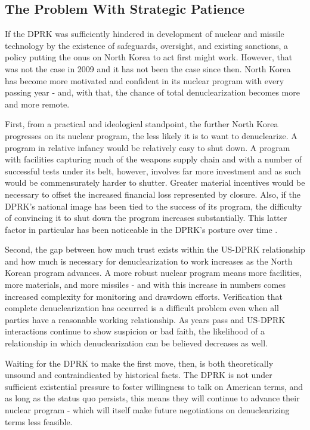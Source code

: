 \subsection{The Problem With Strategic Patience}

If the DPRK was sufficiently hindered in development of nuclear and missile technology by the existence of safeguards, oversight, and existing sanctions, a policy putting the onus on North Korea to act first might work. However, that was not the case in 2009 and it has not been the case since then. North Korea has become more motivated and confident in its nuclear program with every passing year - and, with that, the chance of total denuclearization becomes more and more remote.

First, from a practical and ideological standpoint, the further North Korea progresses on its nuclear program, the less likely it is to want to denuclearize. A program in relative infancy would be relatively easy to shut down. A program with facilities capturing much of the weapons supply chain and with a number of successful tests under its belt, however, involves far more investment and as such would be commensurately harder to shutter. Greater material incentives would be necessary to offset the increased financial loss represented by closure. Also, if the DPRK's national image has been tied to the success of its program, the difficulty of convincing it to shut down the program increases substantially. This latter factor in particular has been noticeable in the DPRK's posture over time \cite{rich14,hecker2}.

Second, the gap between how much trust exists within the US-DPRK relationship and how much is necessary for denuclearization to work increases as the North Korean program advances. A more robust nuclear program means more facilities, more materials, and more missiles - and with this increase in numbers comes increased complexity for monitoring and drawdown efforts. Verification that complete denuclearization has occurred is a difficult problem even when all parties have a reasonable working relationship. As years pass and US-DPRK interactions continue to show suspicion or bad faith, the likelihood of a relationship in which denuclearization can be believed decreases as well.

Waiting for the DPRK to make the first move, then, is both theoretically unsound and contraindicated by historical facts. The DPRK is not under sufficient existential pressure to foster willingness to talk on American terms, and as long as the status quo persists, this means they will continue to advance their nuclear program - which will itself make future negotiations on denuclearizing terms less feasible.

